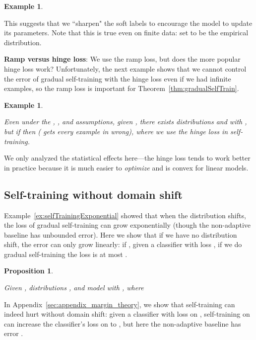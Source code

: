 \documentclass[11pt]{article}
\newtheorem{example}[theorem]{Example}
\newtheorem{proposition}[theorem]{Proposition}
\begin{document}
\begin{example}
\label{ex:softLabelsBad}
\softLabelsBadText{}
\end{example}

This suggests that we ``sharpen" the soft labels to encourage the model to update its parameters.
Note that this is true even on finite data: set  to be the empirical distribution.

\textbf{Ramp versus hinge loss}:
We use the ramp loss, but does the more popular hinge loss  work?
Unfortunately, the next example shows that we cannot control the error of gradual self-training with the hinge loss even if we had infinite examples, so the ramp loss is important for Theorem~\ref{thm:gradualSelfTrain}.

\newcommand{\HingeLossBadText}{
  Even under the \sepAssump, \noLabShiftAssump, and \gradShiftAssump{} assumptions,
  given , there exists distributions  and  with , but if  then  ( gets every example in  wrong), where we use the hinge loss in self-training.
}

\begin{example}
\label{ex:hingeLossBad}
\HingeLossBadText{}
\end{example}

We only analyzed the statistical effects here---the hinge loss tends to work better in practice because it is much easier to \emph{optimize} and is convex for linear models.


\subsection{Self-training without domain shift}

Example~\ref{ex:selfTrainingExponential} showed that when the distribution shifts, the loss of gradual self-training can grow exponentially (though the non-adaptive baseline has unbounded error).
Here we show that if we have no distribution shift, the error can only grow linearly: if , given a classifier with loss , if we do gradual self-training the loss is at most .

\newcommand{\selfTrainingNoShiftBoundText}{
  Given , distributions , and model  with ,  where 
}

\begin{proposition}
\label{prop:selfTrainingNoShiftBound}
\selfTrainingNoShiftBoundText{}
\end{proposition}

In Appendix~\ref{sec:appendix_margin_theory}, we show that self-training can indeed hurt without domain shift: given a classifier with loss  on , self-training on  can increase the classifier's loss on  to , but here the non-adaptive baseline has error .
\end{document}
